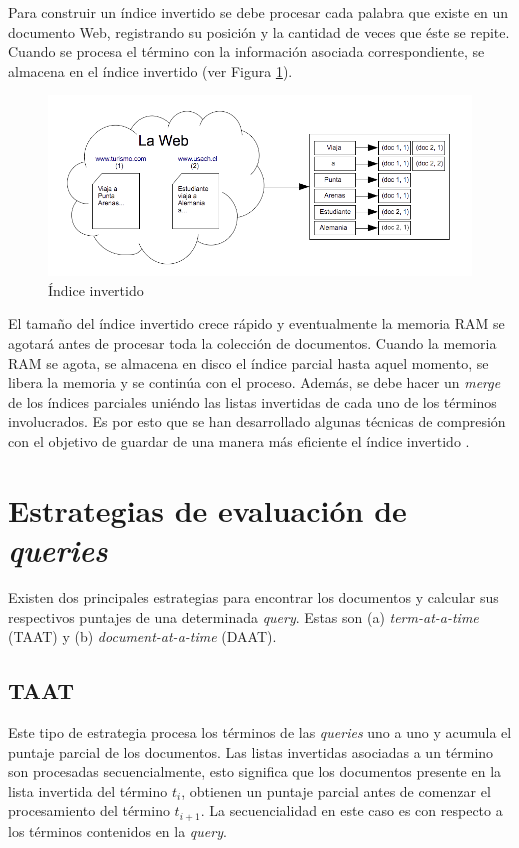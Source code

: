 Para construir un índice invertido \citep{Baeza-Yates:2011, Salton:2003} se debe procesar cada palabra que existe en un documento Web, registrando su posición y la cantidad de veces que éste se repite. Cuando se procesa el término con la información asociada correspondiente, se almacena en el índice invertido (ver Figura \ref{fig:invertedindex}).

\begin{figure}[tp]
\centering
\includegraphics[scale=.75]{images/invertedindex.png}
\caption{\'Indice invertido}
\label{fig:invertedindex}
\end{figure}

El tamaño del índice invertido crece rápido y eventualmente la memoria RAM se agotará antes de procesar toda la colección de documentos. Cuando la memoria RAM se agota, se almacena en disco el índice parcial hasta aquel momento, se libera la memoria y se continúa con el proceso. Además, se debe hacer un \textit{merge} de los índices parciales uniéndo las listas invertidas de cada uno de los términos involucrados. Es por esto que se han desarrollado algunas técnicas de compresión con el objetivo de guardar de una manera más eficiente el índice invertido \citep{Arroyuelo:2013, Baeza-Yates:2011, Yan:2009}.

\section{Estrategias de evaluaci\'on de \textit{queries}}
\label{marco:eeq}
Existen dos principales estrategias para encontrar los documentos y calcular sus respectivos puntajes de una determinada \textit{query}. Estas son (a) \textit{term-at-a-time} (TAAT) y (b) \textit{document-at-a-time} (DAAT).

\subsection{TAAT}
Este tipo de estrategia procesa los términos de las \textit{queries} uno a uno y acumula el puntaje parcial de los documentos. Las listas invertidas asociadas a un término son procesadas secuencialmente, esto significa que los documentos presente en la lista invertida del término $t_{i}$, obtienen un puntaje parcial antes de comenzar el procesamiento del término $t_{i+1}$. La secuencialidad en este caso es con respecto a los términos contenidos en la \textit{query}.

